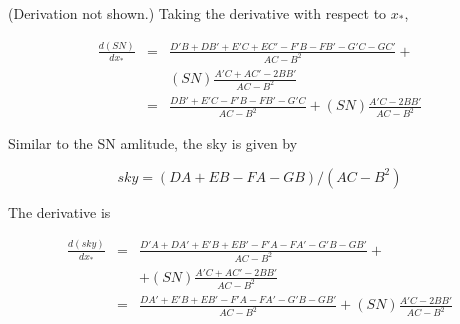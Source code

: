 \documentclass[12pt]{article}
\begin{document}
\noindent (Derivation not shown.) Taking the derivative with
respect to $x_\ast$,

\begin{eqnarray*}
\frac{d(SN)}{dx_\ast} &=& \frac{D'B + DB' + E'C + EC' - F'B - FB' - G'C - GC'}{AC - B^2} + \\
                     & & (SN) \frac{A'C + AC' - 2BB'}{AC-B^2} \\
                     &=& \frac{DB' + E'C - F'B - FB' - G'C}{AC - B^2} + (SN) \frac{A'C - 2BB'}{AC-B^2}
\end{eqnarray*}

Similar to the SN amlitude, the sky is given by

\begin{equation}
sky = (DA + EB - FA - GB) / (AC - B^2)
\end{equation}

\noindent The derivative is

\begin{eqnarray*}
\frac{d(sky)}{dx_\ast} &=& \frac{D'A + DA' + E'B + EB' - F'A - FA' - G'B - GB'}{AC - B^2} + \\
                   & &  + (SN) \frac{A'C + AC' - 2BB'}{AC-B^2} \\
                   &=& \frac{DA' + E'B + EB' - F'A - FA' - G'B - GB'}{AC - B^2} + (SN) \frac{A'C - 2BB'}{AC-B^2}
\end{eqnarray*}
\end{document}
